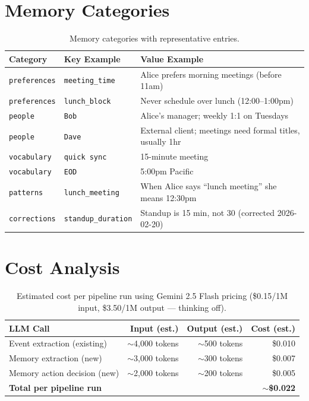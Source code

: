 \documentclass[11pt, letterpaper]{article}
\begin{document}
\section{Memory Categories}

\begin{table}[h]
\centering
\small
\begin{tabularx}{\textwidth}{llX}
\toprule
\textbf{Category} & \textbf{Key Example} & \textbf{Value Example} \\
\midrule
\texttt{preferences} & \texttt{meeting\_time} & Alice prefers morning meetings (before 11am) \\
\texttt{preferences} & \texttt{lunch\_block} & Never schedule over lunch (12:00--1:00pm) \\
\texttt{people} & \texttt{Bob} & Alice's manager; weekly 1:1 on Tuesdays \\
\texttt{people} & \texttt{Dave} & External client; meetings need formal titles, usually 1hr \\
\texttt{vocabulary} & \texttt{quick sync} & 15-minute meeting \\
\texttt{vocabulary} & \texttt{EOD} & 5:00pm Pacific \\
\texttt{patterns} & \texttt{lunch\_meeting} & When Alice says ``lunch meeting'' she means 12:30pm \\
\texttt{corrections} & \texttt{standup\_duration} & Standup is 15 min, not 30 (corrected 2026-02-20) \\
\bottomrule
\end{tabularx}
\caption{Memory categories with representative entries.}
\end{table}

\section{Cost Analysis}

\begin{table}[h]
\centering
\begin{tabularx}{\textwidth}{Xrrr}
\toprule
\textbf{LLM Call} & \textbf{Input (est.)} & \textbf{Output (est.)} & \textbf{Cost (est.)} \\
\midrule
Event extraction (existing) & $\sim$4,000 tokens & $\sim$500 tokens & \$0.010 \\
Memory extraction (new) & $\sim$3,000 tokens & $\sim$300 tokens & \$0.007 \\
Memory action decision (new) & $\sim$2,000 tokens & $\sim$200 tokens & \$0.005 \\
\midrule
\textbf{Total per pipeline run} & & & \textbf{$\sim$\$0.022} \\
\bottomrule
\end{tabularx}
\caption{Estimated cost per pipeline run using Gemini 2.5 Flash pricing
(\$0.15/1M input, \$3.50/1M output --- thinking off).}
\end{table}
\end{document}
